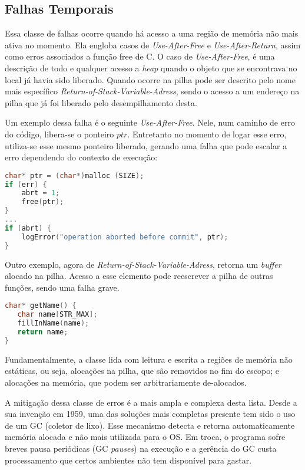 \subsection{Falhas Temporais}
\label{sec:mem-error:temporal}

Essa classe de falhas ocorre quando há acesso a uma região de memória não mais ativa no momento. Ela engloba casos de \emph{Use-After-Free} e \emph{Use-After-Return}, assim como erros associados a função free de C. 
O caso de \emph{Use-After-Free}, é uma descrição de todo e qualquer acesso a \emph{heap} quando o objeto que se encontrava no local já havia sido liberado. Quando ocorre na pilha pode ser descrito pelo nome mais específico 
\emph{Return-of-Stack-Variable-Adress}, sendo o acesso a um endereço na pilha que já foi liberado pelo desempilhamento desta.

Um exemplo dessa falha é o seguinte \emph{Use-After-Free}. Nele, num caminho de erro do código, libera-se o ponteiro $ptr$. Entretanto no momento de logar esse erro, utiliza-se esse mesmo ponteiro liberado, gerando uma falha que pode escalar a erro dependendo do contexto de execução:
\begin{lstlisting}[language=C, label={lst:temporal-error-heap-c}, caption=Exemplo de uma Falha Temporal na \emph{Heap}]
char* ptr = (char*)malloc (SIZE);  
if (err) {
	abrt = 1;  
	free(ptr);
}  
...  
if (abrt) {
	logError("operation aborted before commit", ptr);
}
\end{lstlisting}

Outro exemplo, agora de \emph{Return-of-Stack-Variable-Adress}, retorna um \emph{buffer} alocado na pilha. Acesso a esse elemento pode reescrever a pilha de outras funções, sendo uma falha grave.

\begin{lstlisting}[language=C, label={lst:temporal-error-stack-c}, caption=Exemplo de uma Falha Temporal na Pilha]
char* getName() {
   char name[STR_MAX];  
   fillInName(name);  
   return name;
}
\end{lstlisting}

Fundamentalmente, a classe lida com leitura e escrita a regiões de memória não estáticas, ou seja, alocações na pilha, que são removidos no fim do escopo; e alocações na memória, que podem ser arbitrariamente de-alocados.


\label{sec:mem-error:GC}
A mitigação dessa classe de erros é a mais ampla e complexa desta lista. Desde a sua invenção em 1959, uma das soluções mais completas presente tem sido o uso de um GC (coletor de lixo). Esse mecanismo detecta e retorna automaticamente memória alocada e não mais utilizada para o OS. Em troca, o programa sofre breves pausa periódicas (GC \emph{pauses}) na execução e a gerência do GC custa processamento que certos ambientes não tem disponível para gastar.

